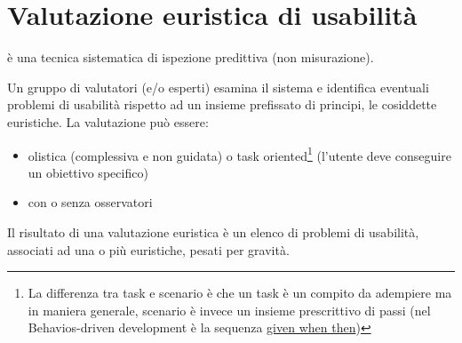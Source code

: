\documentclass[11pt,a4paper]{book}
\begin{document}
\section{Valutazione euristica di usabilità}
è una tecnica sistematica di ispezione predittiva (non misurazione).

Un gruppo di valutatori (e/o esperti) esamina il sistema e identifica eventuali problemi di usabilità rispetto ad un insieme prefissato di principi, le cosiddette euristiche. La valutazione può essere:
\begin{itemize}
	\item olistica (complessiva e non guidata) o task oriented\footnote{La differenza tra task e scenario è che un task è un compito da adempiere ma in maniera generale, scenario è invece un insieme prescrittivo di passi (nel Behavios-driven development è la sequenza \href{https://martinfowler.com/bliki/GivenWhenThen.html}{given when then})} (l'utente deve conseguire un obiettivo specifico)
	\item con o senza osservatori
\end{itemize}

Il risultato di una valutazione euristica è un elenco di problemi di usabilità, associati ad una o più euristiche, pesati per gravità.
\end{document}
